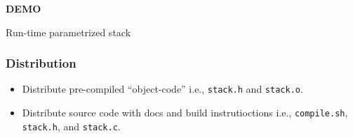 \begin{frame}

\begin{center}

\Huge \textbf{DEMO}

\bigskip

\large Run-time parametrized stack

\end{center}

\end{frame}


\begin{frame}

\frametitle{Distribution}

\begin{itemize}

\item Distribute pre-compiled ``object-code'' i.e., \texttt{stack.h} and
\texttt{stack.o}.

\item Distribute source code with docs and build instrutioctions i.e.,
\texttt{compile.sh}, \texttt{stack.h}, and \texttt{stack.c}.

\end{itemize}

\end{frame}
